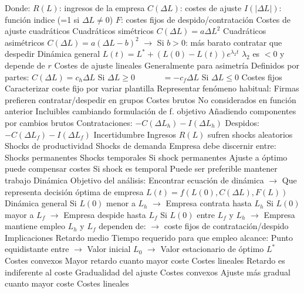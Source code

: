 \documentclass{nuevotema}
\begin{document}
\begin{esquemal}
				\4 Donde:
				\4[] $R(L)$: ingresos de la empresa
				\4[] $C(\Delta L)$: costes de ajuste
				\4[] $I(| \Delta{L} |)$: función indice (=1 si $\Delta{L} \neq 0$)
				\4[] $F$: costes fijos de despido/contratación
			\3 Costes de ajuste cuadráticos
				\4 Cuadráticos simétricos
				\4[] $C(\Delta{L}) = a \Delta{L} ^2$
				\4 Cuadráticos asimétricos
				\4[] $C(\Delta{L}) = a (\Delta{L} - b)^2$
				\4[] $\to$ Si $b>0$: más barato contratar que despedir
				\4 Dinámica general
				\4[] $L(t) = L^* + (L(0) - L(t)) e^{\lambda_2 t}$
				\4[] $\lambda_2$ es $<0$ y depende de $r$
			\3 Costes de ajuste lineales
				\4 Generalmente para asimetría
				\4 Definidos por partes:
				\4[] $C(\Delta L) = c_h \Delta L$ Si $\Delta L \geq 0$
				\4[] $\quad \quad \quad = -c_f \Delta L$ Si $\Delta L \leq 0$
			\3 Costes fijos
				\4 Caracterizar coste fijo por variar plantilla
				\4 Representar fenómeno habitual:
				\4[] Firmas prefieren contratar/despedir en grupos
			\3 Costes brutos
				\4 No considerados en función anterior
				\4 Incluibles cambiando formulación de f. objetivo
				\4 Añadiendo componentes por cambios brutos
				\4[] Contrataciones: $-C(\Delta L_h) - I(\Delta L_h)$
				\4[] Despidos: $-C(\Delta L_f) - I(\Delta L_f)$
			\3 Incertidumbre
				\4 Ingresos $R(L)$ sufren shocks aleatorios
				\4[] Shocks de productividad
				\4[] Shocks de demanda
				\4 Empresa debe discernir entre:
				\4[] Shocks permanentes
				\4[] Shocks temporales
				\4 Si shock permanentes
				\4[] Ajuste a óptimo puede compensar costes
				\4 Si shock es temporal
				\4[] Puede ser preferible mantener trabajo
			\3 Dinámica
				\4 Objetivo del análisis:
				\4[] Encontrar ecuación de dinámica
				\4[] $\to$ Que representa decisión óptima de empresa
				\4[] $L(t) = f(L(0), C(\Delta L), F(L))$
				\4 Dinámica general
				\4[] Si $L(0)$ menor a $L_h$
				\4[] $\to$ Empresa contrata hasta $L_h$
				\4[] Si $L(0)$ mayor a $L_f$
				\4[] $\to$ Empresa despide hasta $L_f$
				\4[] Si $L(0)$ entre $L_f$ y $L_h$
				\4[] $\to$ Empresa mantiene empleo
				\4[] $L_h$ y $L_f$ dependen de:
				\4[] $\to$ coste fijos de contratación/despido
		\2 Implicaciones
			\3 Retardo medio
				\4 Tiempo requerido para que empleo alcance:
				\4[] Punto equidistante entre
				\4[] $\to$ Valor inicial $L_0$
				\4[] $\to$ Valor estacionario de óptimo $L^*$
				\4 Costes convexos
				\4[] Mayor retardo cuanto mayor coste
				\4 Costes lineales
				\4[] Retardo es indiferente al coste
			\3 Gradualidad del ajuste
				\4 Costes convexos
				\4[] Ajuste más gradual cuanto mayor coste
				\4 Costes lineales

\end{esquemal}
\end{document}
